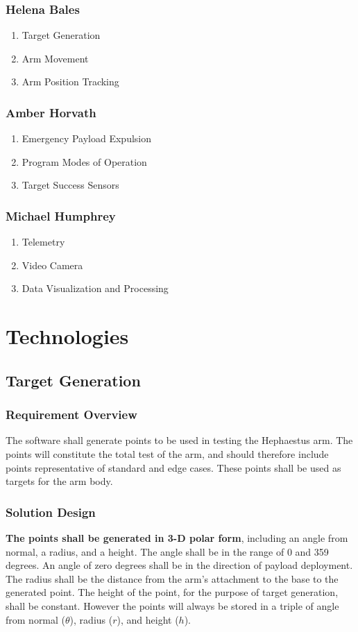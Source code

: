 \documentclass[letterpaper,10pt]{article}
\begin{document}
\subsubsection{Helena Bales}
\begin{enumerate}
\item{Target Generation}
\item{Arm Movement}
\item{Arm Position Tracking}
\end{enumerate}
\subsubsection{Amber Horvath}
\begin{enumerate}
\item{Emergency Payload Expulsion}
\item{Program Modes of Operation}
\item{Target Success Sensors}
\end{enumerate}
\subsubsection{Michael Humphrey}
\begin{enumerate}
\item{Telemetry}
\item{Video Camera}
\item{Data Visualization and Processing}
\end{enumerate}

\section{Technologies}
\subsection{Target Generation}
\subsubsection{Requirement Overview}
The software shall generate points to be used in testing the Hephaestus arm.
The points will constitute the total test of the arm, and should therefore include points
representative of standard and edge cases.
These points shall be used as targets for the arm body.

\subsubsection{Solution Design}
\textbf{The points shall be generated in 3-D polar form}, including an angle from normal, a radius, 
and a height. 
The angle shall be in the range of 0 and 359 degrees.
An angle of zero degrees shall be in the direction of payload deployment.
The radius shall be the distance from the arm's attachment to the base to the generated point.
The height of the point, for the purpose of target generation, shall be constant.
However the points will always be stored in a triple of angle from normal (\(\theta\)), radius (\(r\)), and height (\(h\)).
\end{document}
